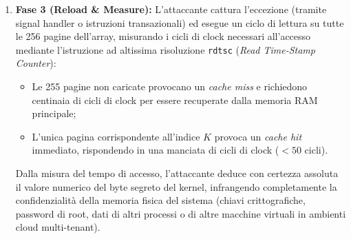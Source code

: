 \documentclass[../../main.tex]{subfiles}
\begin{document}
\begin{enumerate}
    \item \textbf{Fase 3 (Reload \& Measure):} L'attaccante cattura l'eccezione (tramite signal handler o istruzioni transazionali) ed esegue un ciclo di lettura su tutte le 256 pagine dell'array, misurando i cicli di clock necessari all'accesso mediante l'istruzione ad altissima risoluzione \texttt{rdtsc} (\textit{Read Time-Stamp Counter}):
    \begin{itemize}
        \item Le 255 pagine non caricate provocano un \textit{cache miss} e richiedono centinaia di cicli di clock per essere recuperate dalla memoria RAM principale;
        \item L'unica pagina corrispondente all'indice $K$ provoca un \textit{cache hit} immediato, rispondendo in una manciata di cicli di clock ($<50$ cicli).
    \end{itemize}
    Dalla misura del tempo di accesso, l'attaccante deduce con certezza assoluta il valore numerico del byte segreto del kernel, infrangendo completamente la confidenzialità della memoria fisica del sistema (chiavi crittografiche, password di root, dati di altri processi o di altre macchine virtuali in ambienti cloud multi-tenant).
\end{enumerate}
\end{document}
